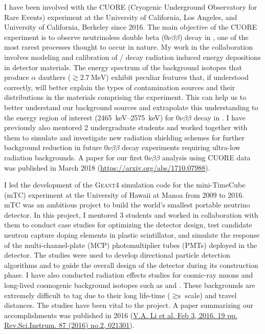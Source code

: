 \documentclass[11pt]{article} %
\begin{document}
I have been involved with the CUORE (Cryogenic Underground Observatory for Rare
Events) experiment at the University of California, Los Angeles, and University
of California, Berkeley since 2016. The main objective of the CUORE experiment
is to observe neutrinoless double beta ($0\nu\beta\beta$) decay in
, one of the most rarest processes thought to occur in nature. My
work in the collaboration involves modeling and calibration of
/ decay radiation induced energy depositions in
detector materials. The energy spectrum of the background isotopes that produce
$\alpha$ dauthers ($\gtrsim \SI{2.7}{\mega\electronvolt}$) exhibit peculiar
features that, if understood correctly, will better explain the types of
contamination sources and their distributions in the materials comprising the
experiment. This can help us to better understand our background sources and
extrapolate this understanding to the energy region of interest
(\SIrange{2465}{2575}{\kilo\electronvolt}) for $0\nu\beta\beta$ decay in
. I have previously also mentored 2 undergraduate students and
worked together with them to simulate and investigate new radiation shielding
schemes for further background reduction in future $0\nu\beta\beta$ decay
experiments requiring ultra-low radiation backgrounds. A paper for our first
$0\nu\beta\beta$ analysis using CUORE data was published in March 2018
(\href{https://arxiv.org/abs/1710.07988}{https://arxiv.org/abs/1710.07988}).

I led the development of the \textsc{Geant4} simulation code for the
mini-TimeCube (mTC) experiment at the University of Hawaii at Manoa from 2009
to 2016. mTC was an ambitious project to build the world's smallest portable
neutrino detector. In this project, I mentored 3 students and worked in
collaboration with them to conduct case studies for optimizing the detector
design, test candidate neutron capture doping elements in plastic scintillator,
and simulate the response of the multi-channel-plate (MCP) photomultiplier
tubes (PMTs) deployed in the detector. The studies were used to develop
directional particle detection algorithms and to guide the overall design of the
detector during its construction phase. I have also conducted radiation effects
studies for cosmic-ray muons and long-lived cosmogenic background isotopes such
as  and . These backgrounds are extremely difficult to
tag due to their long life-time ($\gtrsim \si{\second}$ scale) and travel
distances. The studies have been vital to the project. A paper summarizing our
accomplishments was published in 2016
(\href{https://arxiv.org/abs/1602.01405}{V.A. Li et al. Feb 3, 2016. 19 pp.
Rev.Sci.Instrum. 87 (2016) no.2, 021301}).
\end{document}
